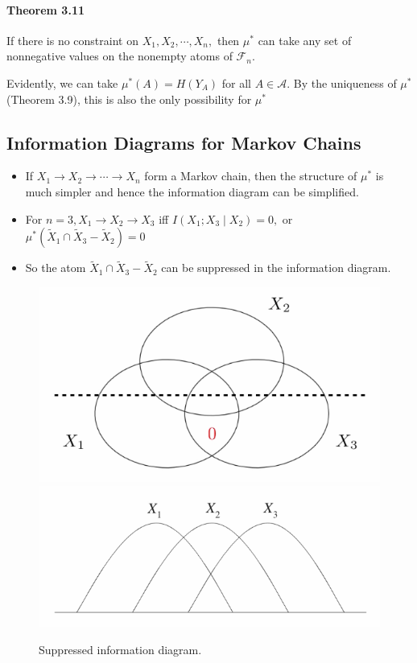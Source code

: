 \documentclass[8pt]{article}
\begin{document}
\begin{tcolorbox}
\paragraph{Theorem 3.11} If there is no constraint on $X_{1}, X_{2}, \cdots, X_{n},$ then $\mu^{*}$ can take any set of nonnegative values on the nonempty atoms of $\mathcal{F}_{n}$. 
\end{tcolorbox}
Evidently, we can take $\mu^{*}(A)=H\left(Y_{A}\right)$ for all $A \in \mathcal{A}$. By the uniqueness of $\mu^{*}$ (Theorem 3.9), this is also the only possibility for $\mu^{*}$


\newpage
\subsection{Information Diagrams for Markov Chains}
\begin{itemize}
    \item If $X_{1} \rightarrow X_{2} \rightarrow \cdots \rightarrow X_{n}$ form a Markov chain, then the structure of $\mu^{*}$ is much simpler and hence the information diagram can be simplified.
    \item For $n=3, X_{1} \rightarrow X_{2} \rightarrow X_{3}$ iff $I\left(X_{1} ; X_{3} \mid X_{2}\right)=0,$ or $\mu^{*}\left(\tilde{X}_{1} \cap \tilde{X}_{3}-\tilde{X}_{2}\right)=0$
    \item So the atom $\tilde{X}_{1} \cap \tilde{X}_{3}-\tilde{X}_{2}$ can be suppressed in the information diagram.
\end{itemize}
\begin{figure}[!h]
    \centering
    \includegraphics[width=0.33\linewidth]{imgs/exp3_4_1.png} \qquad
    \includegraphics[width=0.4\linewidth]{imgs/exp3_4_2.png}
    \caption{Suppressed information diagram.}
    \label{fig:my_label}
\end{figure}
\end{document}
